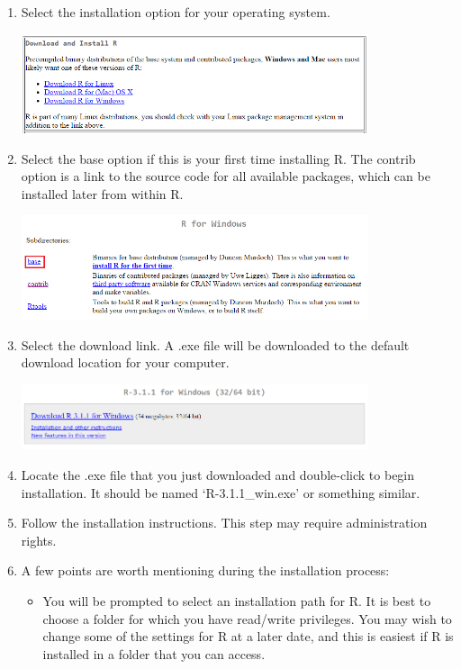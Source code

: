 \documentclass[letterpaper,12pt]{article}\usepackage[]{graphicx}\usepackage[]{color}
\begin{document}
\begin{enumerate}
\item{Select the installation option for your operating system.}

\includegraphics[width=0.8\textwidth]{figs/installos.png}

\item{Select the base option if this is your first time installing R.  The contrib option is a link to the source code for all available packages, which can be installed later from within R.}

\includegraphics[width=0.8\textwidth]{figs/base.png}

\item{Select the download link. A .exe file will be downloaded to the default download location for your computer.}

\includegraphics[width=0.8\textwidth]{figs/download.png}

\item{Locate the .exe file that you just downloaded and double-click to begin installation.  It should be named `R-3.1.1\_win.exe' or something similar.}

\item{Follow the installation instructions.  This step may require administration rights.}

\item{A few points are worth mentioning during the installation process:}

\begin{itemize}

\item{You will be prompted to select an installation path for R.  It is best to choose a folder for which you have read/write privileges.  You may wish to change some of the settings for R at a later date, and this is easiest if R is installed in a folder that you can access.}


\end{itemize}
\end{enumerate}
\end{document}

